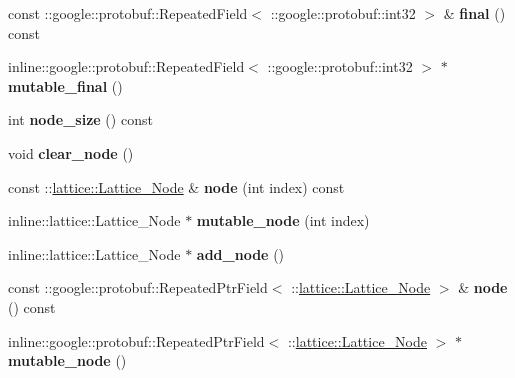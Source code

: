 \begin{DoxyCompactItemize}
\item 
\hypertarget{classlattice_1_1Lattice_a2625e8a95bb6bc92ba4a4fb2ac54eea3}{
const ::google::protobuf::RepeatedField$<$ ::google::protobuf::int32 $>$ \& {\bfseries final} () const }
\label{classlattice_1_1Lattice_a2625e8a95bb6bc92ba4a4fb2ac54eea3}

\item 
\hypertarget{classlattice_1_1Lattice_a67607f04271c09637e771736078ab8b3}{
inline::google::protobuf::RepeatedField$<$ ::google::protobuf::int32 $>$ $\ast$ {\bfseries mutable\_\-final} ()}
\label{classlattice_1_1Lattice_a67607f04271c09637e771736078ab8b3}

\item 
\hypertarget{classlattice_1_1Lattice_ac6bb945f03a05b0e6fa66a5cdb17b854}{
int {\bfseries node\_\-size} () const }
\label{classlattice_1_1Lattice_ac6bb945f03a05b0e6fa66a5cdb17b854}

\item 
\hypertarget{classlattice_1_1Lattice_a21e99bbb5d73a80f4b3e79f053880b8f}{
void {\bfseries clear\_\-node} ()}
\label{classlattice_1_1Lattice_a21e99bbb5d73a80f4b3e79f053880b8f}

\item 
\hypertarget{classlattice_1_1Lattice_a388ba232d3051c050c645c4c5c49d8f0}{
const ::\hyperlink{classlattice_1_1Lattice__Node}{lattice::Lattice\_\-Node} \& {\bfseries node} (int index) const }
\label{classlattice_1_1Lattice_a388ba232d3051c050c645c4c5c49d8f0}

\item 
\hypertarget{classlattice_1_1Lattice_a80fd09af5dc4f602e3744ca984c55a57}{
inline::lattice::Lattice\_\-Node $\ast$ {\bfseries mutable\_\-node} (int index)}
\label{classlattice_1_1Lattice_a80fd09af5dc4f602e3744ca984c55a57}

\item 
\hypertarget{classlattice_1_1Lattice_abca614b554f335e8ea3c7a8950648113}{
inline::lattice::Lattice\_\-Node $\ast$ {\bfseries add\_\-node} ()}
\label{classlattice_1_1Lattice_abca614b554f335e8ea3c7a8950648113}

\item 
\hypertarget{classlattice_1_1Lattice_a76ff012c0dca5d00c46275522327852c}{
const ::google::protobuf::RepeatedPtrField$<$ ::\hyperlink{classlattice_1_1Lattice__Node}{lattice::Lattice\_\-Node} $>$ \& {\bfseries node} () const }
\label{classlattice_1_1Lattice_a76ff012c0dca5d00c46275522327852c}

\item 
\hypertarget{classlattice_1_1Lattice_ad1e861068dce2238dc2405442d40afa0}{
inline::google::protobuf::RepeatedPtrField$<$ ::\hyperlink{classlattice_1_1Lattice__Node}{lattice::Lattice\_\-Node} $>$ $\ast$ {\bfseries mutable\_\-node} ()}
\label{classlattice_1_1Lattice_ad1e861068dce2238dc2405442d40afa0}

\end{DoxyCompactItemize}
